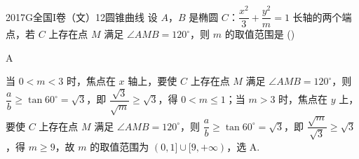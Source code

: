 
\begin{problem}{2017}{G}{全国I卷（文）}{12}{圆锥曲线}
设 $ A $，$ B $ 是椭圆 $ C $：$ \dfrac{x^2}{3}+\dfrac{y^2}{m}=1 $ 长轴的两个端点，若 $ C $ 上存在点 $ M $ 满足 $ \angle AMB=120^\circ $，则 $ m $ 的取值范围是 (\hspace{1cm})
\begin{choices}
\choice{{$(0,1]\cup[9,+\infty)$}}
\choice{{$(0,\sqrt{3}]\cup[9,+\infty)$}}
\choice{{$(0,1]\cup[4,+\infty)$}}
\choice{{$(0,\sqrt{3}]\cup[4,+\infty)$}}
\end{choices}
\end{problem}

\begin{answer}
A
\end{answer}

\begin{solutions}
当 $ 0<m<3 $ 时，焦点在 $ x $ 轴上，要使 $ C $ 上存在点 $ M $ 满足 $ \angle AMB=120^\circ $，则 $ \dfrac{a}{b}\geq\tan60^\circ=\sqrt{3} $，即 $ \dfrac{\sqrt{3}}{\sqrt{m}}\geq\sqrt{3} $，得 $ 0<m\leq1 $；当 $ m>3 $ 时，焦点在 $ y $ 上，要使 $ C $ 上存在点 $ M $ 满足 $ \angle AMB=120^\circ $，则 $ \dfrac{a}{b}\geq\tan60^\circ=\sqrt{3} $，即 $ \dfrac{\sqrt{m}}{\sqrt{3}}\geq\sqrt{3} $，得 $ m\geq9 $，故 $ m $ 的取值范围为 $ (0,1]\cup[9,+\infty) $，选 A.
\end{solutions}